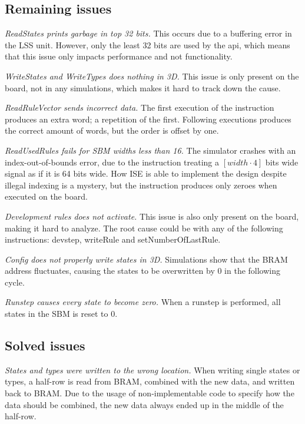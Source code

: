 \subsection{Remaining issues}
\label{sec:remaining-issues}

\emph{ReadStates prints garbage in top 32 bits.}
This occurs due to a buffering error in the LSS unit.
However, only the least 32 bits are used by the api, which means that this issue only impacts performance and not functionality.

\emph{WriteStates and WriteTypes does nothing in 3D.}
This issue is only present on the board, not in any simulations, which makes it hard to track down the cause.

\emph{ReadRuleVector sends incorrect data.}
The first execution of the instruction produces an extra word; a repetition of the first.
Following executions produces the correct amount of words, but the order is offset by one.

\emph{ReadUsedRules fails for SBM widths less than 16.}
The simulator crashes with an index-out-of-bounds error, due to the instruction treating a $[width\cdot4]$ bits wide signal as if it is 64 bits wide.
How ISE is able to implement the design despite illegal indexing is a mystery, but the instruction produces only zeroes when executed on the board.

\emph{Development rules does not activate.}
This issue is also only present on the board, making it hard to analyze.
The root cause could be with any of the following instructions: devstep, writeRule and setNumberOfLastRule.

\emph{Config does not properly write states in 3D.}
Simulations show that the BRAM address fluctuates, causing the states to be overwritten by 0 in the following cycle.

\emph{Runstep causes every state to become zero.}
When a runstep is performed, all states in the SBM is reset to 0.

\subsection{Solved issues}
\label{sec:solved-issues}

\emph{States and types were written to the wrong location.}
When writing single states or types, a half-row is read from BRAM, combined with the new data, and written back to BRAM.
Due to the usage of non-implementable code to specify how the data should be combined, the new data always ended up in the middle of the half-row.

